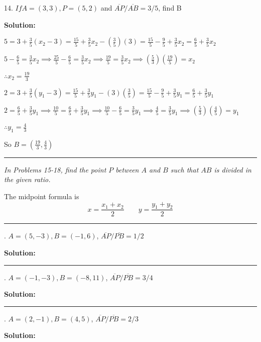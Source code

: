 \documentclass[10pt,letterpaper]{article}
\begin{document}
\pagebreak

14. $If A=(3,3), P=(5,2)$ and $\overline{AP}/\overline{AB}=3/5$, find B

\medskip
{} {\textbf{{\color{blue}Solution}:}}

\medskip
$5=3+\frac{3}{5}(x_2-3)=\frac{15}{5}+\frac{3}{5}x_2-(\frac{3}{5})(3)=\frac{15}{5}-\frac{9}{5}+\frac{3}{5}x_2=\frac{6}{5}+\frac{3}{5}x_2$

\medskip
$5-\frac{6}{5}=\frac{3}{5}x_2 \implies \frac{25}{5}-\frac{6}{5}=\frac{3}{5}x_2 \implies \frac{19}{5}=\frac{3}{5}x_2 \implies (\frac{5}{3})(\frac{19}{5})=x_2$

\medskip
$\therefore x_2=\frac{19}{3}$

\medskip
$2=3+\frac{3}{5}(y_1-3)=\frac{15}{5}+\frac{3}{5}y_1-(3)(\frac{3}{5})=\frac{15}{5}-\frac{9}{5}+\frac{3}{5}y_1=\frac{6}{5}+\frac{3}{5}y_1$

\medskip
$2=\frac{6}{5}+\frac{3}{5}y_1 \implies \frac{10}{5}=\frac{6}{5}+\frac{3}{5}y_1 \implies \frac{10}{5}-\frac{6}{5}=\frac{3}{5}y_1 \implies \frac{4}{5}=\frac{3}{5}y_1 \implies (\frac{5}{3})(\frac{4}{5})=y_1$

\medskip
$\therefore y_1=\frac{4}{3}$

\medskip
So $B=(\frac{19}{3},\frac{4}{3})$

\noindent\rule{15cm}{0.4pt}

\medskip
\textit{In Problems 15-18, find the point $P$ between $A$ and $B$ such that $AB$ is divided in the given ratio.}
\medskip

\medskip
The midpoint formula is \[ x = \frac{x_1+x_2}{2} \qquad y=\frac{y_1+y_2}{2} \]


\noindent\rule{15cm}{0.4pt}

. $A=(5,-3), B=(-1,6)$, $\overline{AP}/\overline{PB}=1/2$

\medskip
{} {\textbf{{\color{blue}Solution}:}}

\medskip



\noindent\rule{15cm}{0.4pt}

. $A=(-1,-3), B=(-8,11)$, $\overline{AP}/\overline{PB}=3/4$

\medskip
{} {\textbf{{\color{blue}Solution}:}}

\noindent\rule{15cm}{0.4pt}

. $A=(2,-1), B=(4,5)$, $\overline{AP}/\overline{PB}=2/3$

\medskip
{} {\textbf{{\color{blue}Solution}:}}
\end{document}

